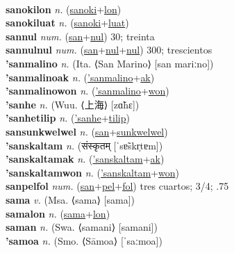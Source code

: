 \label{sanokiles} \\
\textbf{sanokilon} \textit{n.} (\hyperref[sanoki]{sanoki}+\hyperref[lon]{lon})
 \label{sanokilon} \\
\textbf{sanokiluat} \textit{n.} (\hyperref[sanoki]{sanoki}+\hyperref[luat]{luat})
 \label{sanokiluat} \\
\textbf{sannul} \textit{num.} (\hyperref[san]{san}+\hyperref[nul]{nul})
30; treinta \label{sannul} \\
\textbf{sannulnul} \textit{num.} (\hyperref[san]{san}+\hyperref[nul]{nul}+\hyperref[nul]{nul})
300; trescientos \label{sannulnul} \\
\textbf{'sanmalino} \textit{n.} (Ita. ⟨San Marino⟩ [san mariːno])
 \label{'sanmalino} \\
\textbf{'sanmalinoak} \textit{n.} (\hyperref['sanmalino]{'sanmalino}+\hyperref[ak]{ak})
 \label{'sanmalinoak} \\
\textbf{'sanmalinowon} \textit{n.} (\hyperref['sanmalino]{'sanmalino}+\hyperref[won]{won})
 \label{'sanmalinowon} \\
\textbf{'sanhe} \textit{n.} (Wuu. ⟨上海⟩ [zɑ̃hɛ])
 \label{'sanhe} \\
\textbf{'sanhetilip} \textit{n.} (\hyperref['sanhe]{'sanhe}+\hyperref[tilip]{tilip})
 \label{'sanhetilip} \\
\textbf{sansunkwelwel} \textit{n.} (\hyperref[san]{san}+\hyperref[sunkwelwel]{sunkwelwel})
 \label{sansunkwelwel} \\
\textbf{'sanskaltam} \textit{n.} ({\devanagari{}संस्कृतम्} [ˈsɐ̃skr̩tɐm])
 \label{'sanskaltam} \\
\textbf{'sanskaltamak} \textit{n.} (\hyperref['sanskaltam]{'sanskaltam}+\hyperref[ak]{ak})
 \label{'sanskaltamak} \\
\textbf{'sanskaltamwon} \textit{n.} (\hyperref['sanskaltam]{'sanskaltam}+\hyperref[won]{won})
 \label{'sanskaltamwon} \\
\textbf{sanpelfol} \textit{num.} (\hyperref[san]{san}+\hyperref[pel]{pel}+\hyperref[fol]{fol})
tres cuartos; 3/4; .75 \label{sanpelfol} \\
\textbf{sama} \textit{v.} (Msa. ⟨sama⟩ [sama])
 \label{sama} \\
\textbf{samalon} \textit{n.} (\hyperref[sama]{sama}+\hyperref[lon]{lon})
 \label{samalon} \\
\textbf{saman} \textit{n.} (Swa. ⟨samani⟩ [samani])
 \label{saman} \\
\textbf{'samoa} \textit{n.} (Smo. ⟨Sāmoa⟩ [ˈsaːmoa])
 \label{'samoa} \\
